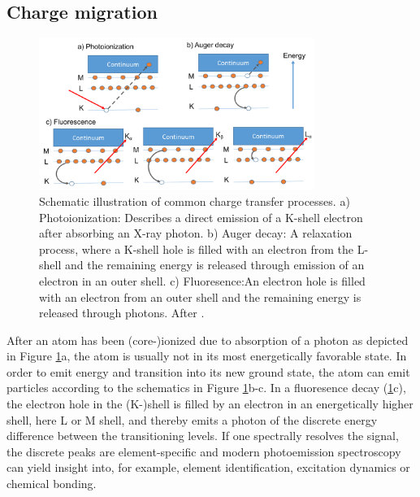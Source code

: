 \subsection{Charge migration}\label{sec:relaxation}
\begin{figure}
	\centering
		\includegraphics[width=0.80\textwidth]{images/el-relaxation.png}
	\caption[Schematic illustration of common charge transfer processes]{Schematic illustration of common charge transfer processes. a) Photoionization: Describes a direct emission of a K-shell electron after absorbing an X-ray photon. b) Auger decay: A relaxation process, where a K-shell hole is filled with an electron from the L-shell and the remaining energy is released through emission of an electron in an outer shell. c) Fluoresence:An electron hole is filled with an electron from an outer shell and the remaining energy is released through photons. After \citep[][p.~19]{Als-Nielson-2011-JWS}.}
	\label{fig:el-relaxation}
\end{figure}
After an atom has been (core-)ionized due to absorption of a photon as depicted in Figure \ref{fig:el-relaxation}a, the atom is usually not in its most energetically favorable state. In order to emit energy and transition into its new ground state, the atom can emit particles according to the schematics in Figure \ref{fig:el-relaxation}b-c. In a fluoresence decay (\ref{fig:el-relaxation}c), the electron hole in the (K-)shell is filled by an electron in an energetically higher shell, here L or M shell, and thereby emits a photon of the discrete energy difference between the transitioning levels. If one spectrally resolves the signal, the discrete peaks are element-specific and modern photoemission spectroscopy can yield insight into, for example, element identification, excitation dynamics or chemical bonding.

